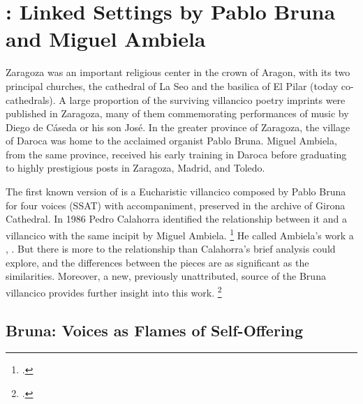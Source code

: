 

\section[\quoted{Let Voices Ascend to Heaven}]
{: Linked Settings by Pablo Bruna
and Miguel Ambiela}

Zaragoza was an important religious center in the crown of Aragon, with its two
principal churches, the cathedral of La Seo and the basilica of El Pilar (today
co-cathedrals).%
    \Autocite{Ezquerro:CatalogoZaragoza}
A large proportion of the surviving villancico poetry imprints were published
in Zaragoza, many of them commemorating performances of music by Diego de
Cáseda or his son José.
In the greater province of Zaragoza, the village of Daroca was home to the
acclaimed organist Pablo Bruna.  
Miguel Ambiela, from the same province, received his early training in Daroca
before graduating to highly prestigious posts in Zaragoza, Madrid, and Toledo.


The first known version of  is a Eucharistic
villancico composed by Pablo Bruna for four voices (SSAT) with accompaniment,
preserved in the archive of Girona Cathedral.%
    \Autocite{Calahorra:Suban}
In 1986 Pedro Calahorra identified the relationship between it and a 
villancico with the same incipit by Miguel Ambiela.%
    \footnote{.}
He called Ambiela's work a , .%
    \Autocite[9]{Calahorra:Suban}
But there is more to the relationship than Calahorra's brief analysis could
explore, and the differences between the pieces are as significant as the
similarities.
Moreover, a new, previously unattributed, source of the Bruna villancico
provides further insight into this work.%
    \footnote{.}


\subsection{Bruna: Voices as Flames of Self-Offering}

